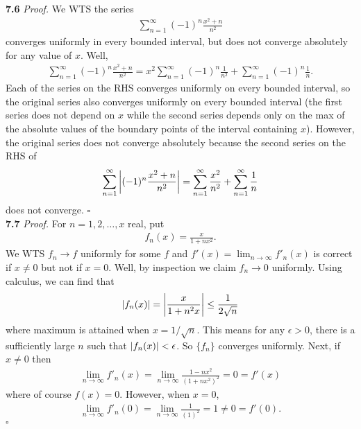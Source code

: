 \documentclass[11pt]{article}
\begin{document}
\noindent \textbf{7.6}
\noindent \textit{Proof.} We WTS the series 
\begin{align*}
\sum^\infty_{n=1} (-1)^n \frac{x^2+n}{n^2}
\end{align*}
converges uniformly in every bounded interval, but does not converge absolutely for any value of $x$. Well, 
\begin{align*}
\sum^\infty_{n=1} (-1)^n \frac{x^2+n}{n^2} = x^2\sum^\infty_{n=1}(-1)^n\frac{1}{n^2} + \sum^\infty_{n=1}(-1)^n\frac{1}{n}.
\end{align*}
Each of the series on the RHS converges uniformly on every bounded interval, so the original series also converges uniformly on every bounded interval (the first series does not depend on $x$ while the second series depends only on the max of the absolute values of the boundary points of the interval containing $x$). However, the original series does not converge absolutely because the second series on the RHS of 
\begin{align*}
\sum^\infty_{n=1}\abs{(-1)^n\frac{x^2+n}{n^2}} = \sum^\infty_{n=1}\frac{x^2}{n^2} + \sum^\infty_{n=1}\frac{1}{n}
\end{align*}
does not converge. \hfill $\square$\\




\noindent \textbf{7.7}
\noindent \textit{Proof.}  For $n=1,2,\dots, x$ real, put
\begin{align*}
f_n(x) = \frac{x}{1+nx^2}.
\end{align*}
We WTS $f_n \to f$ uniformly for some $f$ and $f'(x) = \lim_{n\to \infty}f'_n(x)$ is correct if $x\neq 0$ but not if $x = 0$. Well, by inspection we claim $f_n \to 0$ uniformly. Using calculus, we can find that
\begin{align*}
\abs{f_n(x)} = \abs{\frac{x}{1+n^2x}} \leq \frac{1}{2\sqrt{n}}
\end{align*}
where maximum is attained when $x = 1/\sqrt{n}$. This means for any $\epsilon > 0$, there is a sufficiently large $n$ such that $\abs{f_n(x)} < \epsilon$. So $\{ f_n\}$ converges uniformly. Next, if $x\neq 0$ then 
\begin{align*}
\lim_{n\to \infty}f'_n(x) = \lim_{n\to \infty} \frac{1-nx^2}{(1+nx^2)^2} = 0 = f'(x)
\end{align*}
where of course $f(x) = 0$. However, when $x=0$, 
\begin{align*}
\lim_{n\to \infty}f'_n(0) = \lim_{n\to \infty} \frac{1}{(1)^2} = 1 \neq 0 = f'(0).
\end{align*}
\hfill $\square$


  
\end{document}
